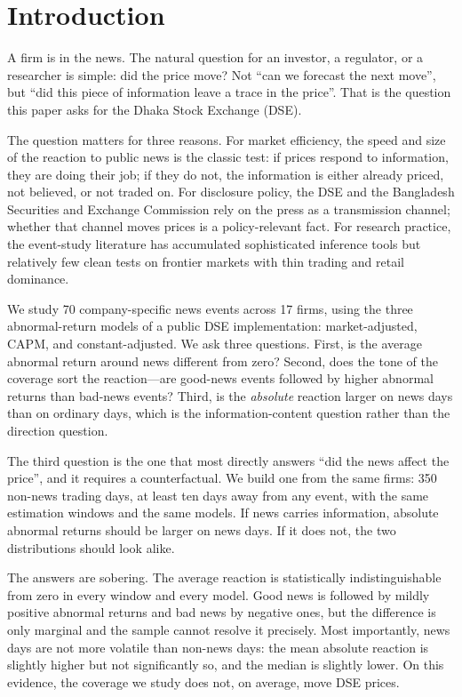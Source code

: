 \documentclass[10pt,twocolumn,a4paper]{article}
\begin{document}
\section{Introduction}

A firm is in the news. The natural question for an investor, a regulator, or a researcher is simple:
did the price move? Not ``can we forecast the next move'', but ``did this piece of information leave a
trace in the price''. That is the question this paper asks for the Dhaka Stock Exchange (DSE).

The question matters for three reasons. For market efficiency, the speed and size of the reaction to
public news is the classic test: if prices respond to information, they are doing their job; if they do
not, the information is either already priced, not believed, or not traded on. For disclosure policy,
the DSE and the Bangladesh Securities and Exchange Commission rely on the press as a transmission
channel; whether that channel moves prices is a policy-relevant fact. For research practice, the
event-study literature has accumulated sophisticated inference tools but relatively few clean tests on
frontier markets with thin trading and retail dominance.

We study 70 company-specific news events across 17 firms, using the three abnormal-return models of a
public DSE implementation: market-adjusted, CAPM, and constant-adjusted. We ask three questions. First,
is the average abnormal return around news different from zero? Second, does the tone of the coverage
sort the reaction---are good-news events followed by higher abnormal returns than bad-news events?
Third, is the \emph{absolute} reaction larger on news days than on ordinary days, which is the
information-content question rather than the direction question.

The third question is the one that most directly answers ``did the news affect the price'', and it
requires a counterfactual. We build one from the same firms: 350 non-news trading days, at least ten
days away from any event, with the same estimation windows and the same models. If news carries
information, absolute abnormal returns should be larger on news days. If it does not, the two
distributions should look alike.

The answers are sobering. The average reaction is statistically indistinguishable from zero in every
window and every model. Good news is followed by mildly positive abnormal returns and bad news by
negative ones, but the difference is only marginal and the sample cannot resolve it precisely. Most
importantly, news days are not more volatile than non-news days: the mean absolute reaction is
slightly higher but not significantly so, and the median is slightly lower. On this evidence, the
coverage we study does not, on average, move DSE prices.
\end{document}
